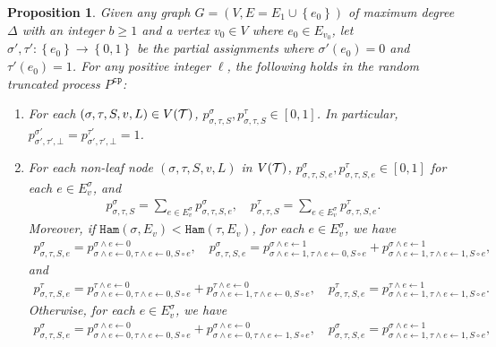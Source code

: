 \documentclass[11pt]{article}
\newtheorem{proposition}[theorem]{Proposition}
\newcommand{\set}[1]{\left\{#1\right\}}
\def\!#1{\mathtt{#1}}
\newcommand{\hktodo}[1]{{\color{blue}{#1}}}
\begin{document}
\hktodo{the notation $S\circ e$ is strange}
    \begin{proposition}
    Given any graph $G=(V,E=E_1\cup \set{e_0})$ of maximum degree $\Delta$ with an integer $b\geq 1$ and a vertex $v_0\in V$ where $e_0\in E_{v_0}$, let $\sigma',\tau': \set{e_0}\rightarrow \set{0,1}$ be the partial assignments where $\sigma'(e_0)=0$ and $\tau'(e_0)=1$.
    For any positive integer $\ell$, the following holds in the random truncated process $P^{\!{cp}}$:
        \begin{enumerate}
            \item For each $(\sigma,\tau,S,v,L)\in V(\mathcal{T})$, $p^{\sigma}_{\sigma,\tau,S},p^{\tau}_{\sigma,\tau,S}\in [0,1]$. In particular, $p^{\sigma'}_{\sigma',\tau',\bot}=p^{\tau'}_{\sigma',\tau',\bot}=1$.
            \item For each non-leaf node $(\sigma,\tau,S,v,L)$ in $V(\mathcal{T})$, $p^{\sigma}_{\sigma,\tau,S,e},p^{\tau}_{\sigma,\tau,S,e}\in [0,1]$ for each $e\in E_v^{\sigma}$, and 
            \begin{align}\label{eqn-inter-sum1}
               p^{\sigma}_{\sigma,\tau,S}=\sum_{e\in  E_v^{\sigma}} p^{\sigma}_{\sigma,\tau,S,e},\quad  p^{\tau}_{\sigma,\tau,S}=\sum_{e\in  E_v^{\sigma}} p^{\tau}_{\sigma,\tau,S,e}.
            \end{align}
            Moreover, if {${\!{Ham}\left(\sigma,{E_v}\right)}<{\!{Ham}\left(\tau,{E_v}\right)}$}, for each $e\in E_v^{\sigma}$, we have 
            \begin{align}\label{eqn-inner-child-sum1}
                p^{\sigma}_{\sigma,\tau,S,e}=p^{\sigma\land e\gets 0}_{\sigma\land e\gets 0,\tau\land e\gets 0,S\circ e}, \quad  p^{\sigma}_{\sigma,\tau,S,e}=p^{\sigma\land e\gets 1}_{\sigma\land e\gets 1,\tau\land e\gets 0,S\circ e} + p^{\sigma\land e\gets 1}_{\sigma\land e\gets 1,\tau\land e\gets 1,S\circ e},
            \end{align}
            and
            \begin{align}\label{eqn-inner-child-sum2}
                p^{\tau}_{\sigma,\tau,S,e}=p^{\tau\land e\gets 0}_{\sigma\land e\gets 0,\tau\land e\gets 0,S\circ e}+p^{\tau\land e\gets 0}_{\sigma\land e\gets 1,\tau\land e\gets 0,S\circ e}, \quad  p^{\tau}_{\sigma,\tau,S,e}=p^{\tau\land e\gets 1}_{\sigma\land e\gets 1,\tau\land e\gets 1,S\circ e}.
            \end{align}
            Otherwise, for each $e\in E_v^{\sigma}$, we have
            \begin{align}\label{eqn-inner-child-sum3}
                p^{\sigma}_{\sigma,\tau,S,e}=p^{\sigma \land e\gets 0}_{\sigma\land e\gets 0,\tau\land e\gets 0,S\circ e}+p^{\sigma\land e\gets 0}_{\sigma\land e\gets 0,\tau\land e\gets 1,S\circ e}, \quad  p^{\sigma}_{\sigma,\tau,S,e}=p^{\sigma\land e\gets 1}_{\sigma\land e\gets 1,\tau\land e\gets 1,S\circ e},

\end{align}
\end{enumerate}
\end{proposition}
\end{document}
